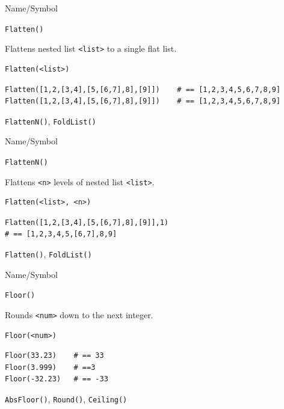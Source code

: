 \begin{desc}{Name/Symbol}
\item[Name/Symbol]	\verb+Flatten()+

\item[Description]
	Flattens nested list \verb+<list>+ to a single flat list.

\item[Usage]
\begin{verbatim}
Flatten(<list>)
\end{verbatim}

\item[Example]
\begin{verbatim}
Flatten([1,2,[3,4],[5,[6,7],8],[9]])	# == [1,2,3,4,5,6,7,8,9]
Flatten([1,2,[3,4],[5,[6,7],8],[9]])	# == [1,2,3,4,5,6,7,8,9]
\end{verbatim}

\item[See Also]	\verb+FlattenN()+, \verb+FoldList()+
\end{desc}



\begin{desc}{Name/Symbol}
\item[Name/Symbol]	\verb+FlattenN()+

\item[Description]	Flattens \verb+<n>+ levels of nested list \verb+<list>+. 

\item[Usage]
\begin{verbatim}
Flatten(<list>, <n>)
\end{verbatim}

\item[Example]
\begin{verbatim}
Flatten([1,2,[3,4],[5,[6,7],8],[9]],1) 
# == [1,2,3,4,5,[6,7],8,9]
\end{verbatim}

\item[See Also]	\verb+Flatten()+, \verb+FoldList()+
\end{desc}



\begin{desc}{Name/Symbol}
\item[Name/Symbol]	\verb+Floor()+

\item[Description]	Rounds \verb+<num>+ down to the next integer.

\item[Usage]
\begin{verbatim}
Floor(<num>)
\end{verbatim}

\item[Example]
\begin{verbatim}
Floor(33.23)	# == 33
Floor(3.999)  	# ==3
Floor(-32.23) 	# == -33
\end{verbatim}
 
\item[See Also]	\verb+AbsFloor()+, \verb+Round()+, \verb+Ceiling()+
\end{desc}

